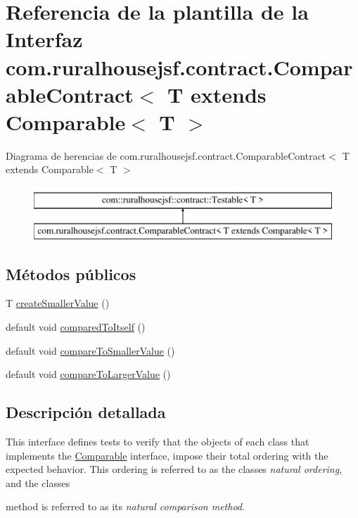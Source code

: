 \hypertarget{interfacecom_1_1ruralhousejsf_1_1contract_1_1_comparable_contract}{}\section{Referencia de la plantilla de la Interfaz com.\+ruralhousejsf.\+contract.\+Comparable\+Contract$<$ T extends Comparable$<$ T $>$}
\label{interfacecom_1_1ruralhousejsf_1_1contract_1_1_comparable_contract}
Diagrama de herencias de com.\+ruralhousejsf.\+contract.\+Comparable\+Contract$<$ T extends Comparable$<$ T $>$\begin{figure}[H]
\begin{center}
\leavevmode
\includegraphics[height=2.000000cm]{db/d3c/interfacecom_1_1ruralhousejsf_1_1contract_1_1_comparable_contract}
\end{center}
\end{figure}
\subsection*{Métodos públicos}
\begin{DoxyCompactItemize}
\item 
T \mbox{\hyperlink{interfacecom_1_1ruralhousejsf_1_1contract_1_1_comparable_contract_a63e1e8c46f202f132c7f15b51a11ee27}{create\+Smaller\+Value}} ()
\item 
default void \mbox{\hyperlink{interfacecom_1_1ruralhousejsf_1_1contract_1_1_comparable_contract_ad21966d20e5fffd0fa13cd021c262f11}{compared\+To\+Itself}} ()
\item 
default void \mbox{\hyperlink{interfacecom_1_1ruralhousejsf_1_1contract_1_1_comparable_contract_aa5df8ced74d7707d219de7d79eb04cb1}{compare\+To\+Smaller\+Value}} ()
\item 
default void \mbox{\hyperlink{interfacecom_1_1ruralhousejsf_1_1contract_1_1_comparable_contract_aceb2f65e9d26e521c6dc0eb2cbe6a35d}{compare\+To\+Larger\+Value}} ()
\end{DoxyCompactItemize}


\subsection{Descripción detallada}
This interface defines tests to verify that the objects of each class that implements the \mbox{\hyperlink{}{Comparable}} interface, impose their total ordering with the expected behavior. This ordering is referred to as the classes {\itshape natural ordering}, and the classes
\begin{DoxyCode}{0}
\end{DoxyCode}
 method is referred to as its {\itshape natural comparison method}. 

